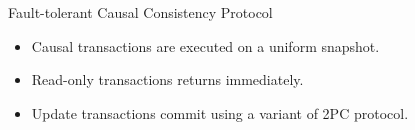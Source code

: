 \begin{frame}{Fault-tolerant Causal Consistency Protocol}
  \begin{itemize}
    \setlength{\itemsep}{8pt}
    \item Causal transactions are executed on a uniform snapshot.
    \item Read-only transactions returns immediately.
    \item Update transactions commit using a variant of 2PC protocol.
  \end{itemize}
\end{frame}
